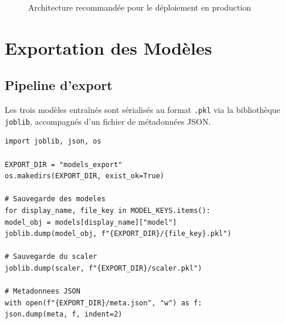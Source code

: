 \documentclass[12pt,a4paper]{article}
\begin{document}
			\begin{figure}[H]
				\centering
				\caption{Architecture recommandée pour le déploiement en production}
				\label{fig:architecture}
			\end{figure}
		\section{Exportation des Modèles}
		
		\subsection{Pipeline d'export}
		
		Les trois modèles entraînés sont sérialisés au format \texttt{.pkl} via la bibliothèque \texttt{joblib}, accompagnés d'un fichier de métadonnées JSON.
		
		\begin{lstlisting}[style=pythonstyle, caption={Exportation des modèles via joblib}]
import joblib, json, os

EXPORT_DIR = "models_export"
os.makedirs(EXPORT_DIR, exist_ok=True)

# Sauvegarde des modeles
for display_name, file_key in MODEL_KEYS.items():
model_obj = models[display_name]["model"]
joblib.dump(model_obj, f"{EXPORT_DIR}/{file_key}.pkl")

# Sauvegarde du scaler
joblib.dump(scaler, f"{EXPORT_DIR}/scaler.pkl")

# Metadonnees JSON
with open(f"{EXPORT_DIR}/meta.json", "w") as f:
json.dump(meta, f, indent=2)
		\end{lstlisting}
\end{document}
